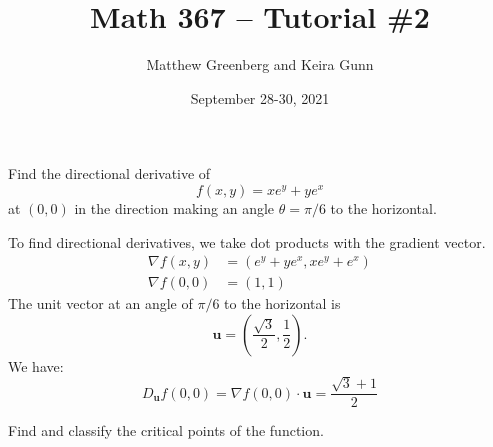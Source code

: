 \documentclass[answers]{exam}
\newcommand{\vu}{\mathbf{u}}
\begin{document}
\title{Math 367 -- Tutorial \#2}
\author{Matthew Greenberg and Keira Gunn}
\date{September 28-30, 2021}
\maketitle

\begin{questions}
    \setlength\itemsep{1em}
    \question Find the directional derivative of
    \[
        f(x,y) = xe^y + ye^x
    \]
    at $(0,0)$ in the direction making an angle $\theta=\pi/6$ to the horizontal.

    \begin{solution}
        To find directional derivatives, we take dot products with the gradient vector.
        \begin{align*}
            \nabla f(x,y) &= (e^y + ye^x, xe^y + e^x)\\
            \nabla f(0,0) &= (1,1)
        \end{align*}
    The unit vector at an angle of $\pi/6$ to the horizontal is
    \[
        \vu = \left(\frac{\sqrt3}2,\frac{1}{2}\right).
    \]
    We have:
    \[
        D_\vu f(0,0) = \nabla f(0,0)\cdot \vu = \frac{\sqrt3 + 1}{2}
    \]
    \end{solution}

    \question
    Find and classify the critical points of the function.

\end{questions}
\end{document}
